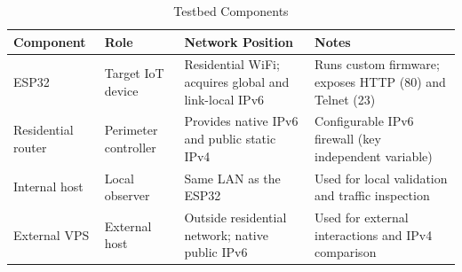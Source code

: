 \begin{table}[H]
    \centering
    \caption{Testbed Components}
    \label{tab:testbed-components}
    \begin{tabularx}{\textwidth}{p{} p{} L L}
        \toprule
        \textbf{\color{white}Component} & \textbf{\color{white}Role} & \textbf{\color{white}Network Position} & \textbf{\color{white}Notes} \\
        \midrule
        ESP32 & Target IoT device & Residential WiFi; acquires global and link-local IPv6 & Runs custom firmware; exposes HTTP (80) and Telnet (23) \\
        Residential router & Perimeter controller & Provides native IPv6 and public static IPv4 & Configurable IPv6 firewall (key independent variable) \\
        Internal host & Local observer & Same LAN as the ESP32 & Used for local validation and traffic inspection \\
        External VPS & External host & Outside residential network; native public IPv6 & Used for external interactions and IPv4 comparison \\
        \bottomrule
    \end{tabularx}
\end{table}
